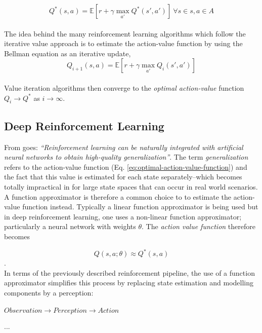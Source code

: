 \begin{equation}\label{eq:bellman}
Q^*(s,a)=\mathbb{E}[r+\gamma \max_{a'} Q^*(s',a')] \ \forall{s}\in{s},  a\in{A}
\end{equation}
\\
The idea behind the many reinforcement learning algorithms which follow the iterative value approach is to estimate the action-value function by using the Bellman equation as an iterative update,
\begin{equation}
Q_{i+1}(s,a)=\mathbb{E}[r+\gamma \max_{a'}Q_{i}(s',a')]
\end{equation}
\\
Value iteration algorithms then converge to the \textit{optimal action-value} function $Q_{i} \rightarrow Q^*$ as $i \rightarrow \infty$. \cite{sutton1998reinforcement}

\subsection{Deep Reinforcement Learning}

From \cite{deeprlcourse} goes: \textit{``Reinforcement learning can be naturally integrated with artificial neural networks to obtain high-quality generalization''}.
The term \textit{generalization} refers to the action-value function (Eq. \ref{eq:optimal-action-value-function}) and the fact that this value is estimated for each state separately--which becomes totally impractical in for large state spaces that can occur in real world scenarios.
A function approximator is therefore a common choice to to estimate the action-value function instead. Typically a linear function approximator is being used but in deep reinforcement learning, one uses a non-linear function approximator; particularly a neural network with weights $\theta$. The \textit{action value function} therefore becomes

\begin{equation}
Q(s, a; \theta) \approx Q^*(s,a)
\end{equation}.
\\
In terms of the previously described reinforcement pipeline, the use of a function approximator simplifies this process by replacing state estimation and modelling components by a perception:
\\
\\
$Observation \rightarrow Perception \rightarrow Action$

...